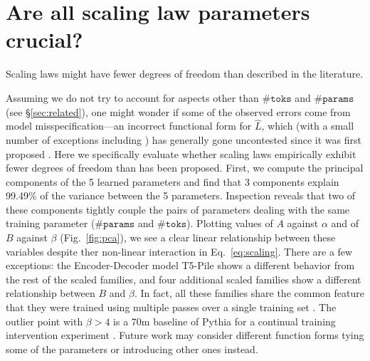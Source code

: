\documentclass{article}
\theoremstyle{plain}
\theoremstyle{definition}
\theoremstyle{remark}
\newcommand{\mathmsize}{\#\texttt{params}}
\newcommand{\mathtokens}{\#\texttt{toks}}
\newcommand{\msize}{$\mathmsize{}$}
\newcommand{\tokens}{$\mathtokens{}$}
\newcommand{\summarybox}[1]{
  \begin{tcolorbox}[
    enhanced,
    colback=olive!8,
    colframe=olive!50,
    boxrule=0.5pt,
    left=8pt,
    right=8pt,
    top=6pt,
    bottom=6pt,
    arc=1.5mm,
    boxsep=0pt,
    fontupper=\normalfont\small\itshape,
    frame hidden,
    before skip=0pt,  %
    after skip=8pt,   %
  ]
    #1
  \end{tcolorbox}
}
\begin{document}
\section{Are all scaling law parameters crucial?}
\summarybox{Scaling laws might have fewer degrees of freedom than described in the literature.}

\label{sec:pca}
Assuming we do not try to account for aspects other than \tokens{} and \msize{} (see \S\ref{sec:related}), one might wonder if some of the observed errors come from model misspecification---an incorrect functional form for $\hat{L}$, which (with a small number of exceptions including \citealp{caballerobroken}) has  generally gone uncontested since it was first proposed \citep{rosenfeldconstructive,hoffmann2022training}. 
Here we specifically evaluate whether scaling laws empirically exhibit fewer degrees of freedom than has been proposed. First, we compute the principal components of the 5 learned parameters and find that 3 components explain 99.49\% of the variance between the 5 parameters. Inspection reveals that two of these components tightly couple the pairs of parameters dealing with the same training parameter (\msize{} and \tokens{}). Plotting values of $A$ against $\alpha$ and of $B$ against $\beta$ (Fig.~\ref{fig:pca}),
we see a clear linear relationship between these variables despite ther non-linear interaction in Eq.~\ref{eq:scaling}. There are a few exceptions: the Encoder-Decoder model T5-Pile shows a different behavior from the rest of the scaled families, and four additional scaled families show a different relationship between $B$ and $\beta$. In fact, all these families share the common feature that they were trained using multiple passes over a single training set
\citet{overtrain}. The outlier point with $\beta>4$ is a 70m baseline of Pythia for a continual training intervention experiment \citep{pythia}. Future work may consider different function forms tying some of the parameters or introducing other ones instead.



\end{document}
